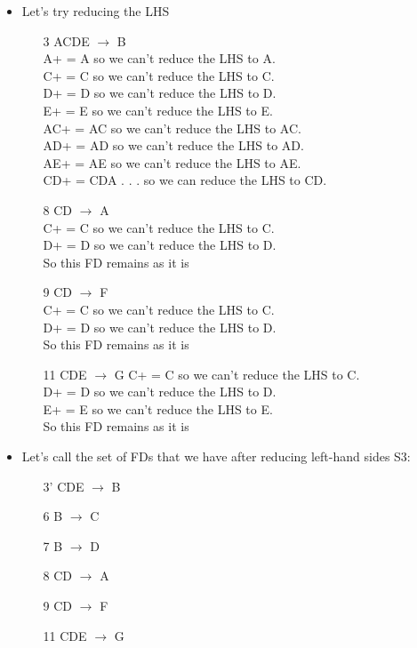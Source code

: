 \documentclass{article}
\begin{document}
\begin{enumerate}
\begin{enumerate} [leftmargin=0pt, itemindent=*]
\begin{itemize}
\item %
Let's try reducing the LHS
\begin{enumerate} 
\item[3] ACDE $\rightarrow$ B \\
A+ = A so we can't reduce the LHS to A. \\
C+ = C so we can't reduce the LHS to C. \\
D+ = D so we can't reduce the LHS to D. \\
E+ = E so we can't reduce the LHS to E. \\
AC+ = AC so we can't reduce the LHS to AC. \\
AD+ = AD so we can't reduce the LHS to AD. \\
AE+ = AE so we can't reduce the LHS to AE. \\
CD+ = CDA . . . so we can reduce the LHS to CD. 
\item[8] CD $\rightarrow$ A \\
C+ = C so we can't reduce the LHS to C. \\
D+ = D so we can't reduce the LHS to D. \\
So this FD remains as it is
\item[9] CD $\rightarrow$ F \\
C+ = C so we can't reduce the LHS to C. \\
D+ = D so we can't reduce the LHS to D. \\
So this FD remains as it is
\item[11] CDE $\rightarrow$ G
C+ = C so we can't reduce the LHS to C. \\
D+ = D so we can't reduce the LHS to D. \\
E+ = E so we can't reduce the LHS to E. \\
So this FD remains as it is
\end{enumerate}

\item %
Let's call the set of FDs that we have after reducing left-hand sides S3:
\begin{enumerate} 
\item[3'] CDE $\rightarrow$ B
\item[6] B $\rightarrow$ C
\item[7] B $\rightarrow$ D
\item[8] CD $\rightarrow$ A
\item[9] CD $\rightarrow$ F
\item[11] CDE $\rightarrow$ G
\end{enumerate}


\end{itemize}
\end{enumerate}
\end{enumerate}
\end{document}
